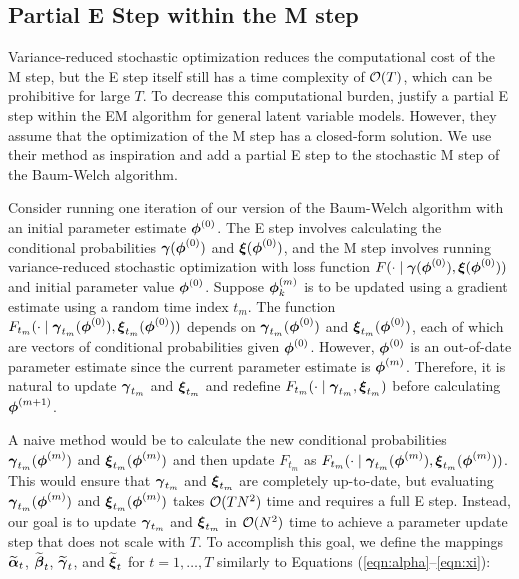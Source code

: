 \subsection{Partial E Step within the M step}
\label{subsec:stoch_E}

Variance-reduced stochastic optimization reduces the computational cost of the M step, but the E step itself still has a time complexity of $\mathcal{O}(T)$, which can be prohibitive for large $T$. To decrease this computational burden, \citet{Neal:1998} justify a partial E step within the EM algorithm for general latent variable models. However, they assume that the optimization of the M step has a closed-form solution. We use their method as inspiration and add a partial E step to the stochastic M step of the Baum-Welch algorithm. 

Consider running one iteration of our version of the Baum-Welch algorithm with an initial parameter estimate $\boldsymbol{\phi}^{(0)}$. The E step involves calculating the conditional probabilities $\boldsymbol{\gamma}(\boldsymbol{\phi}^{(0)})$ and $\boldsymbol{\xi}(\boldsymbol{\phi}^{(0)})$, and the M step involves running variance-reduced stochastic optimization with loss function $F(\cdot \mid \boldsymbol{\gamma}(\boldsymbol{\phi}^{(0)}),\boldsymbol{\xi}(\boldsymbol{\phi}^{(0)}))$ and initial parameter value $\boldsymbol{\phi}^{(0)}$. Suppose $\boldsymbol{\phi}_k^{(m)}$ is to be updated using a gradient estimate using a random time index $t_m$. The function $F_{t_m}(\cdot \mid \boldsymbol{\gamma}_{t_m}(\boldsymbol{\phi}^{(0)}),\boldsymbol{\xi}_{t_m}(\boldsymbol{\phi}^{(0)}))$ depends on $\boldsymbol{\gamma}_{t_m}(\boldsymbol{\phi}^{(0)})$ and $\boldsymbol{\xi}_{t_m}(\boldsymbol{\phi}^{(0)})$, each of which are vectors of conditional probabilities given $\boldsymbol{\phi}^{(0)}$. However, $\boldsymbol{\phi}^{(0)}$ is an out-of-date parameter estimate since the current parameter estimate is $\boldsymbol{\phi}^{(m)}$. Therefore, it is natural to update $\boldsymbol{\gamma}_{t_m}$ and $\boldsymbol{\xi}_{t_m}$ and redefine $F_{t_m}(\cdot \mid \boldsymbol{\gamma}_{t_m}, \boldsymbol{\xi}_{t_m})$ before calculating $\boldsymbol{\phi}^{(m+1)}$. 

A naive method would be to calculate the new conditional probabilities $\boldsymbol{\gamma}_{t_m}(\boldsymbol{\phi}^{(m)})$ and $\boldsymbol{\xi}_{t_m}(\boldsymbol{\phi}^{(m)})$ and then update $F_{t_m}$ as $F_{t_m}(\cdot \mid \boldsymbol{\gamma}_{t_m}(\boldsymbol{\phi}^{(m)}), \boldsymbol{\xi}_{t_m}(\boldsymbol{\phi}^{(m)}))$. This would ensure that $\boldsymbol{\gamma}_{t_m}$ and $\boldsymbol{\xi}_{t_m}$ are completely up-to-date, but evaluating $\boldsymbol{\gamma}_{t_m}(\boldsymbol{\phi}^{(m)})$ and $\boldsymbol{\xi}_{t_m}(\boldsymbol{\phi}^{(m)})$ takes $\mathcal{O}(TN^2)$ time and requires a full E step. Instead, our goal is to update $\boldsymbol{\gamma}_{t_m}$ and $\boldsymbol{\xi}_{t_m}$ in $\mathcal{O}(N^2)$ time to achieve a parameter update step that does not scale with $T$.
%
To accomplish this goal, we define the mappings $\widetilde {\boldsymbol{\alpha}}_t$, $\widetilde {\boldsymbol{\beta}}_t$, $\widetilde {\boldsymbol{\gamma}}_t$, and $\widetilde {\boldsymbol{\xi}}_t$ for $t = 1,\ldots,T$ similarly to Equations (\ref{eqn:alpha}--\ref{eqn:xi}):

